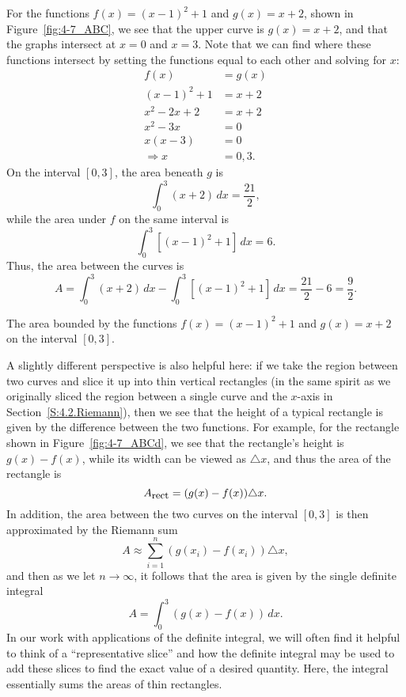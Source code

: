 For the functions $f(x) = (x-1)^2 + 1$ and $g(x) = x+2$, shown in Figure~\ref{fig:4-7_ABC}, we see that the upper curve is $g(x) = x+2$, and that the graphs intersect at $x = 0$ and $x=3$.  Note that we can find where these functions intersect by setting the functions equal to each other and solving for $x$:
\begin{align*}
f(x) & = g(x) \\
(x-1)^2 + 1 & = x+2 \\
x^2 - 2x +2 & = x+2 \\
x^2 - 3x & = 0 \\
x(x-3) & = 0 \\
\Rightarrow x &= 0,3.
\end{align*}
On the interval $[0,3]$, the area beneath $g$ is
\[ \int_0^3 (x+2) \, dx = \frac{21}{2}, \]
while the area under $f$ on the same interval is
\[ \int_0^3 [(x-1)^2 + 1] \, dx = 6. \]
Thus, the area between the curves is 
\begin{equation} \label{E:DiffOfInt} %
A = \int_0^3 (x+2) \, dx -  \int_0^3 [(x-1)^2 + 1] \, dx = \frac{21}{2} - 6 = \frac{9}{2}.
\end{equation}

\begin{marginfigure} %
\caption{The area bounded by the functions $f(x) = (x-1)^2 + 1$ and $g(x) = x+2$ on the interval $[0,3]$.} 
\label{fig:4-7_ABCd}
\end{marginfigure}

A slightly different perspective is also helpful here:  if we take the region between two curves and slice it up into thin vertical rectangles (in the same spirit as we originally sliced the region between a single curve and the $x$-axis in Section~\ref{S:4.2.Riemann}), then we see that the height of a typical rectangle is given by the difference between the two functions.  For example, for the rectangle shown in Figure~\ref{fig:4-7_ABCd}, we see that the rectangle's height is $g(x) - f(x)$, while its width can be viewed as $\triangle x$, and thus the area of the rectangle is
\[ A_{\mbox{\small{rect}}} = (g(x) - f(x)) \triangle x. \]
In addition, the area between the two curves on the interval $[0,3]$ is then approximated by the Riemann sum
\[ A \approx \sum_{i=1}^{n} (g(x_i) - f(x_i)) \triangle x, \]
and then as we let $n \to \infty$, it follows that the area is given by the single definite integral
\begin{equation} \label{E:IntOfDiff} %
A = \int_0^3 (g(x) - f(x)) \, dx.
\end{equation}
In our work with applications of the definite integral, we will often find it helpful to think of a ``representative slice'' and how the definite integral may be used to add these slices to find the exact value of a desired quantity.  Here, the integral essentially sums the areas of thin rectangles.

